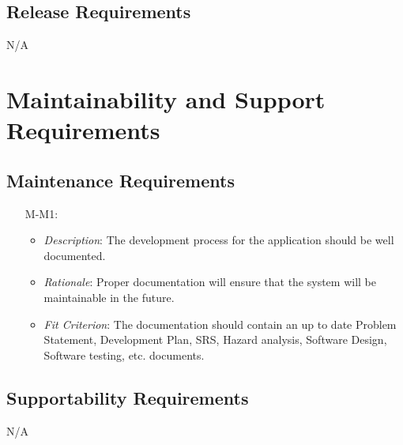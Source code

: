 \documentclass[12pt]{article}
\begin{document}
\subsection{Release Requirements}

N/A


\section{Maintainability and Support Requirements}
\subsection{Maintenance Requirements}
\noindent \begin{itemize}
    \item[M-M1:] 
        \begin{itemize}
            \item \textit{Description}:  The development process for the application should be well documented.
            \item \textit{Rationale}: Proper documentation will ensure that the system will be maintainable in the future.
            \item \textit{Fit Criterion}: The documentation should contain an up to date Problem Statement, Development Plan, SRS, Hazard analysis, Software Design, Software testing, etc. documents. 
        \end{itemize}
\end{itemize}

\subsection{Supportability Requirements}

N/A

\end{document}
